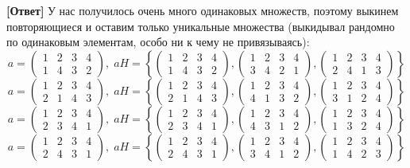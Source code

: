 \documentclass[a4paper,12pt]{article}
\begin{document}
\begin{itemize}
\textbf{[Ответ] }У нас получилось очень много одинаковых множеств, поэтому выкинем повторяющиеся и оставим только уникальные множества (выкидывал рандомно по одинаковым элементам, особо ни к чему не привязываясь):
\[a = \begin{pmatrix} 1 & 2 & 3 & 4 \\ 1&4&3&2\end{pmatrix}, \; aH = \left\{\begin{pmatrix} 1 & 2 & 3 & 4 \\ 1&4&3&2\end{pmatrix}, \begin{pmatrix} 1 & 2 & 3 & 4 \\ 3&4&2&1\end{pmatrix}, \begin{pmatrix} 1 & 2 & 3 & 4 \\ 2&4&1&3\end{pmatrix} \right\}\]
\[a = \begin{pmatrix} 1 & 2 & 3 & 4 \\ 2&1&4&3\end{pmatrix}, \; aH = \left\{\begin{pmatrix} 1 & 2 & 3 & 4 \\ 2&1&4&3\end{pmatrix}, \begin{pmatrix} 1 & 2 & 3 & 4 \\ 4&1&3&2\end{pmatrix}, \begin{pmatrix} 1 & 2 & 3 & 4 \\ 3&1&2&4\end{pmatrix} \right\}\]
\[a = \begin{pmatrix} 1 & 2 & 3 & 4 \\ 2&3&4&1\end{pmatrix}, \; aH = \left\{\begin{pmatrix} 1 & 2 & 3 & 4 \\ 2&3&4&1\end{pmatrix}, \begin{pmatrix} 1 & 2 & 3 & 4 \\ 4&3&1&2\end{pmatrix}, \begin{pmatrix} 1 & 2 & 3 & 4 \\ 1&3&2&4\end{pmatrix} \right\}\]
\[a = \begin{pmatrix} 1 & 2 & 3 & 4 \\ 2&4&3&1\end{pmatrix}, \; aH = \left\{\begin{pmatrix} 1 & 2 & 3 & 4 \\ 2&4&3&1\end{pmatrix}, \begin{pmatrix} 1 & 2 & 3 & 4 \\ 3&4&1&2\end{pmatrix}, \begin{pmatrix} 1 & 2 & 3 & 4 \\ 1&4&2&3\end{pmatrix} \right\}\]

\end{itemize}
\end{document}

